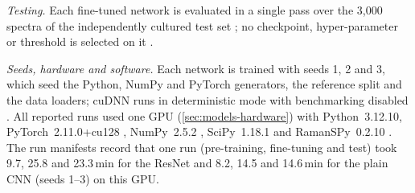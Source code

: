 \documentclass[journal,onecolumn]{IEEEtran}
\begin{document}
\emph{Testing.} Each fine-tuned network is evaluated in a single pass over
the 3{,}000 spectra of the independently cultured test set
\cite{ho2019rapid}; no checkpoint, hyper-parameter or threshold is
selected on it \cite{dietterich1998approximate}.

\emph{Seeds, hardware and software.} Each network is trained with seeds 1,
2 and 3, which seed the Python, NumPy \cite{harris2020array} and PyTorch
\cite{paszke2019pytorch} generators, the reference split and the data
loaders; cuDNN runs in deterministic mode with benchmarking disabled
\cite{pytorch_reproducibility}. All reported runs used one GPU
(\cref{sec:models-hardware}) with Python~3.12.10,
PyTorch~2.11.0+cu128 \cite{paszke2019pytorch},
NumPy~2.5.2 \cite{harris2020array}, SciPy~1.18.1 \cite{virtanen2020scipy}
and RamanSPy~0.2.10 \cite{georgiev2024ramanspy}. The run manifests record that one run
(pre-training, fine-tuning and test) took 9.7, 25.8 and 23.3\,min for the
ResNet and 8.2, 14.5 and 14.6\,min for the plain CNN (seeds 1--3) on this
GPU.
\end{document}
